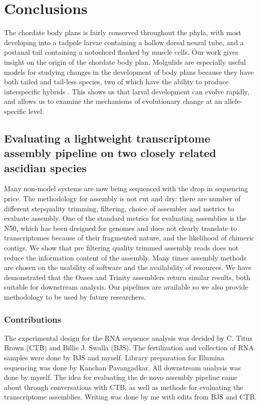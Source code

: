 \chapter{Conclusions}
The chordate body plans is fairly conserved throughout the phyla, with most developing into a tadpole larvae containing a hollow dorsal neural tube, and a postanal tail containing a notochord flanked by muscle cells. Our work gives insight on the origin of the chordate body plan. Molgulids are especially useful models for studying changes in the development of body plans because they have both tailed and tail-less species, two of which have the ability to produce interspecific hybrids \cite{swalla_interspecific_1990}. This shows us that larval development can evolve rapidly, and allows us to examine the mechanisms of evolutionary change at an allele-specific level.

\section{Evaluating a lightweight transcriptome assembly pipeline on two closely related ascidian species}
Many non-model systems are now being sequenced with the drop in sequencing price. The methodology for assembly is not cut and dry: there are number of different step\textemdash quality trimming, filtering, choice of assembler and metrics to evaluate assembly. One of the standard metrics for evaluating assemblies is the N50, which has been designed for genomes and does not clearly translate to transcriptomes because of their fragmented nature, and the likelihood of chimeric contigs. We show that pre filtering quality trimmed assembly reads does not reduce the information content of the assembly. Many times assembly methods are chosen on the usability of software and the availability of resources. We have demonstrated that the Oases and Trinity assemblers return similar results, both suitable for downstream analysis. Our pipelines are available so we also provide methodology to be used by future researchers. 

\subsection{Contributions}
The experimental design for the RNA sequence analysis was decided by C. Titus Brown (CTB) and Billie J. Swalla (BJS). The fertilization and collection of RNA samples were done by BJS and myself. Library preparation for Illumina sequencing was done by Kanchan Pavangadkar. All downstream analysis was done by myself. The idea for evaluating the de novo assembly pipeline came about through conversations with CTB, as well as methods for evaluating the transcriptome assemblies. Writing was done by me with edits from BJS and CTB.

